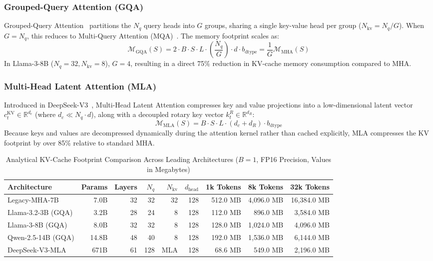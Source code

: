 \documentclass[10pt,twocolumn]{article}
\begin{document}
\subsubsection{Grouped-Query Attention (GQA)}
Grouped-Query Attention~\cite{ainslie2023gqa} partitions the $N_q$ query heads into $G$ groups, sharing a single key-value head per group ($N_{\text{kv}} = N_q / G$). When $G = N_q$, this reduces to Multi-Query Attention (MQA)~\cite{shazeer2019fast}. The memory footprint scales as:
\begin{equation}
\mathcal{M}_{\text{GQA}}(S) = 2 \cdot B \cdot S \cdot L \cdot \left(\frac{N_q}{G}\right) \cdot d \cdot b_{\text{dtype}} = \frac{1}{G} \mathcal{M}_{\text{MHA}}(S)
\end{equation}
In Llama-3-8B ($N_q = 32, N_{\text{kv}} = 8$), $G = 4$, resulting in a direct 75\% reduction in KV-cache memory consumption compared to MHA.

\subsubsection{Multi-Head Latent Attention (MLA)}
Introduced in DeepSeek-V3~\cite{deepseek2024deepseekv3}, Multi-Head Latent Attention compresses key and value projections into a low-dimensional latent vector $c_t^{\text{KV}} \in \mathbb{R}^{d_c}$ (where $d_c \ll N_q \cdot d$), along with a decoupled rotary key vector $k_t^R \in \mathbb{R}^{d_R}$:
\begin{equation}
\mathcal{M}_{\text{MLA}}(S) = B \cdot S \cdot L \cdot (d_c + d_R) \cdot b_{\text{dtype}}
\end{equation}
Because keys and values are decompressed dynamically during the attention kernel rather than cached explicitly, MLA compresses the KV footprint by over 85\% relative to standard MHA.

\begin{table}[t]
\centering
\caption{Analytical KV-Cache Footprint Comparison Across Leading Architectures ($B=1$, FP16 Precision, Values in Megabytes)}
\label{tab:kv_scaling}
\small
\begin{tabular}{lrrrrrrrr}
\toprule
\textbf{Architecture} & \textbf{Params} & \textbf{Layers} & $N_q$ & $N_{\text{kv}}$ & $d_{\text{head}}$ & \textbf{1k Tokens} & \textbf{8k Tokens} & \textbf{32k Tokens} \\
\midrule
Legacy-MHA-7B         & 7.0B   & 32 & 32 & 32 & 128 & 512.0 MB   & 4,096.0 MB  & 16,384.0 MB \\
Llama-3.2-3B (GQA)    & 3.2B   & 28 & 24 &  8 & 128 & 112.0 MB   &   896.0 MB  &  3,584.0 MB \\
Llama-3-8B (GQA)      & 8.0B   & 32 & 32 &  8 & 128 & 128.0 MB   & 1,024.0 MB  &  4,096.0 MB \\
Qwen-2.5-14B (GQA)    & 14.8B  & 48 & 40 &  8 & 128 & 192.0 MB   & 1,536.0 MB  &  6,144.0 MB \\
DeepSeek-V3-MLA       & 671B   & 61 & 128 & MLA & 128 &  68.6 MB   &   549.0 MB  &  2,196.0 MB \\
\bottomrule
\end{tabular}
\end{table}
\end{document}
